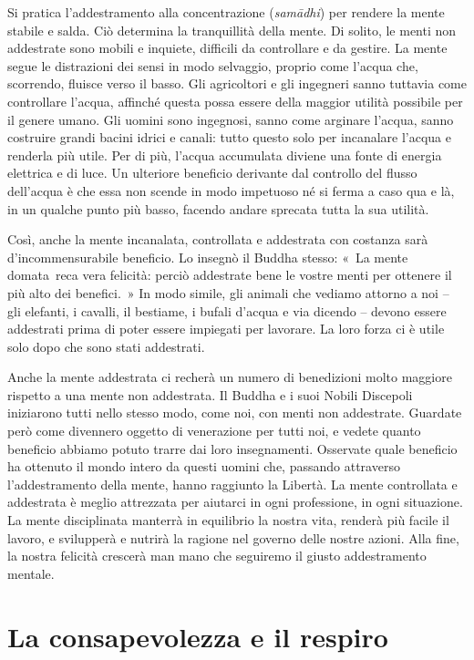 Si pratica l'addestramento alla concentrazione (\emph{samādhi}) per
rendere la mente stabile e salda. Ciò determina la tranquillità della
mente. Di solito, le menti non addestrate sono mobili e inquiete,
difficili da controllare e da gestire. La mente segue le distrazioni dei
sensi in modo selvaggio, proprio come l'acqua che, scorrendo, fluisce
verso il basso. Gli agricoltori e gli ingegneri sanno tuttavia come
controllare l'acqua, affinché questa possa essere della maggior utilità
possibile per il genere umano. Gli uomini sono ingegnosi, sanno come
arginare l'acqua, sanno costruire grandi bacini idrici e canali: tutto
questo solo per incanalare l'acqua e renderla più utile. Per di più,
l'acqua accumulata diviene una fonte di energia elettrica e di luce. Un
ulteriore beneficio derivante dal controllo del flusso dell'acqua è che
essa non scende in modo impetuoso né si ferma a caso qua e là, in un
qualche punto più basso, facendo andare sprecata tutta la sua utilità.

Così, anche la mente incanalata, controllata e addestrata con costanza
sarà d'incommensurabile beneficio. Lo insegnò il Buddha stesso: «~La
mente domata~reca vera felicità: perciò addestrate bene le vostre menti
per ottenere il più alto dei benefici.~» In modo simile, gli animali che
vediamo attorno a noi -- gli elefanti, i cavalli, il bestiame, i bufali
d'acqua e via dicendo -- devono essere addestrati prima di poter essere
impiegati per lavorare. La loro forza ci è utile solo dopo che sono
stati addestrati.

Anche la mente addestrata ci recherà un numero di benedizioni molto
maggiore rispetto a una mente non addestrata. Il Buddha e i suoi Nobili
Discepoli iniziarono tutti nello stesso modo, come noi, con menti non
addestrate. Guardate però come divennero oggetto di venerazione per
tutti noi, e vedete quanto beneficio abbiamo potuto trarre dai loro
insegnamenti. Osservate quale beneficio ha ottenuto il mondo intero da
questi uomini che, passando attraverso l'addestramento della mente,
hanno raggiunto la Libertà. La mente controllata e addestrata è meglio
attrezzata per aiutarci in ogni professione, in ogni situazione. La
mente disciplinata manterrà in equilibrio la nostra vita, renderà più
facile il lavoro, e svilupperà e nutrirà la ragione nel governo delle
nostre azioni. Alla fine, la nostra felicità crescerà man mano che
seguiremo il giusto addestramento mentale.

\section{La consapevolezza e il respiro}


